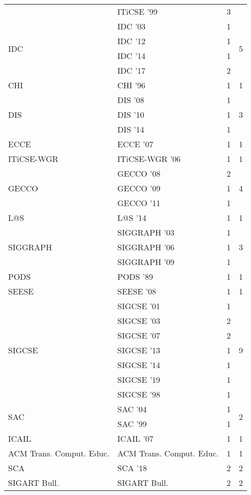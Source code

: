 \begin{table*}[t]
\begin{tabular}{llrr}
& ITiCSE '99 & 3 &\\
\multirow{4}{*}{IDC } & IDC '03 & 1 & \multirow{4}{*}{5}\\
& IDC '12 & 1 &\\
& IDC '14 & 1 &\\
& IDC '17 & 2 &\\
\multirow{1}{*}{CHI } & CHI '96 & 1 & \multirow{1}{*}{1}\\
\multirow{3}{*}{DIS } & DIS '08 & 1 & \multirow{3}{*}{3}\\
& DIS '10 & 1 &\\
& DIS '14 & 1 &\\
\multirow{1}{*}{ECCE } & ECCE '07 & 1 & \multirow{1}{*}{1}\\
\multirow{1}{*}{ITiCSE-WGR } & ITiCSE-WGR '06 & 1 & \multirow{1}{*}{1}\\
\multirow{3}{*}{GECCO } & GECCO '08 & 2 & \multirow{3}{*}{4}\\
& GECCO '09 & 1 &\\
& GECCO '11 & 1 &\\
\multirow{1}{*}{L@S } & L@S '14 & 1 & \multirow{1}{*}{1}\\
\multirow{3}{*}{SIGGRAPH } & SIGGRAPH '03 & 1 & \multirow{3}{*}{3}\\
& SIGGRAPH '06 & 1 &\\
& SIGGRAPH '09 & 1 &\\
\multirow{1}{*}{PODS } & PODS '89 & 1 & \multirow{1}{*}{1}\\
\multirow{1}{*}{SEESE } & SEESE '08 & 1 & \multirow{1}{*}{1}\\
\multirow{7}{*}{SIGCSE } & SIGCSE '01 & 1 & \multirow{7}{*}{9}\\
& SIGCSE '03 & 2 &\\
& SIGCSE '07 & 2 &\\
& SIGCSE '13 & 1 &\\
& SIGCSE '14 & 1 &\\
& SIGCSE '19 & 1 &\\
& SIGCSE '98 & 1 &\\
\multirow{2}{*}{SAC } & SAC '04 & 1 & \multirow{2}{*}{2}\\
& SAC '99 & 1 &\\
\multirow{1}{*}{ICAIL } & ICAIL '07 & 1 & \multirow{1}{*}{1}\\
\multirow{1}{*}{ACM Trans. Comput. Educ.} & ACM Trans. Comput. Educ. & 1 & \multirow{1}{*}{1}\\
\multirow{1}{*}{SCA } & SCA '18 & 2 & \multirow{1}{*}{2}\\
\multirow{1}{*}{SIGART Bull.} & SIGART Bull. & 2 & \multirow{1}{*}{2}\\

\end{tabular}
\end{table*}
